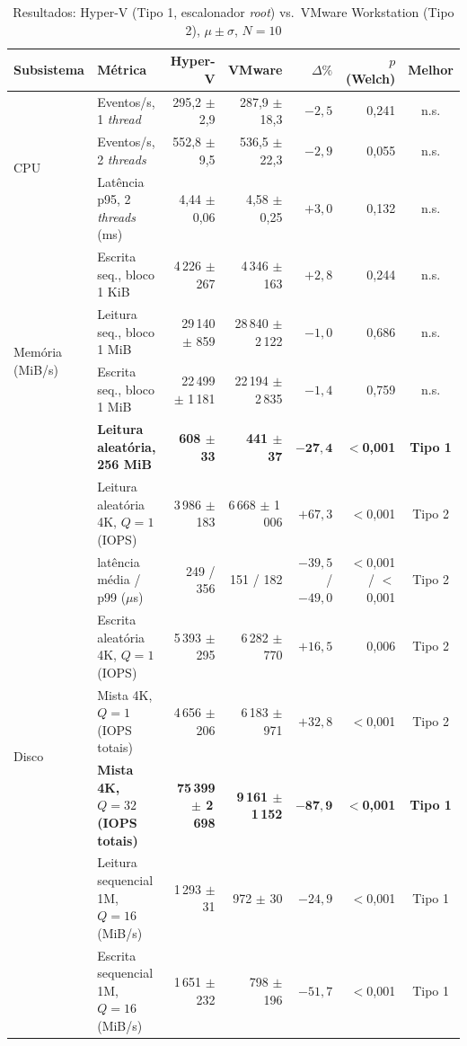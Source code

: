 \documentclass[conference]{IEEEtran}
\begin{document}
\begin{table}[t]
\caption{Resultados: Hyper-V (Tipo 1, escalonador \textit{root}) vs.\ VMware Workstation (Tipo 2), $\mu\pm\sigma$, $N=10$}
\label{tab_res}
\centering
\footnotesize
\begin{tabular}{@{}llrrrrc@{}}
\toprule
\textbf{Subsistema} & \textbf{Métrica} & \textbf{Hyper-V} & \textbf{VMware} & \textbf{$\Delta\%$} & \textbf{$p$ (Welch)} & \textbf{Melhor} \\
\midrule
\multirow{3}{*}{CPU}
 & Eventos/s, 1 \textit{thread} & 295,2 $\pm$ 2,9 & 287,9 $\pm$ 18,3 & $-2{,}5$ & 0,241 & n.s. \\
 & Eventos/s, 2 \textit{threads} & 552,8 $\pm$ 9,5 & 536,5 $\pm$ 22,3 & $-2{,}9$ & 0,055 & n.s. \\
 & Latência p95, 2 \textit{threads} (ms) & 4,44 $\pm$ 0,06 & 4,58 $\pm$ 0,25 & $+3{,}0$ & 0,132 & n.s. \\
\midrule
\multirow{4}{*}{Memória (MiB/s)}
 & Escrita seq., bloco 1 KiB & 4\,226 $\pm$ 267 & 4\,346 $\pm$ 163 & $+2{,}8$ & 0,244 & n.s. \\
 & Leitura seq., bloco 1 MiB & 29\,140 $\pm$ 859 & 28\,840 $\pm$ 2\,122 & $-1{,}0$ & 0,686 & n.s. \\
 & Escrita seq., bloco 1 MiB & 22\,499 $\pm$ 1\,181 & 22\,194 $\pm$ 2\,835 & $-1{,}4$ & 0,759 & n.s. \\
 & \textbf{Leitura aleatória, 256 MiB} & \textbf{608 $\pm$ 33} & \textbf{441 $\pm$ 37} & $\mathbf{-27{,}4}$ & $<$\textbf{0,001} & \textbf{Tipo 1} \\
\midrule
\multirow{7}{*}{Disco}
 & Leitura aleatória 4K, $Q=1$ (IOPS) & 3\,986 $\pm$ 183 & 6\,668 $\pm$ 1\,006 & $+67{,}3$ & $<$0,001 & Tipo 2 \\
 & \quad latência média / p99 ($\mu$s) & 249 / 356 & 151 / 182 & $-39{,}5$ / $-49{,}0$ & $<$0,001 / $<$0,001 & Tipo 2 \\
 & Escrita aleatória 4K, $Q=1$ (IOPS) & 5\,393 $\pm$ 295 & 6\,282 $\pm$ 770 & $+16{,}5$ & 0,006 & Tipo 2 \\
 & Mista 4K, $Q=1$ (IOPS totais) & 4\,656 $\pm$ 206 & 6\,183 $\pm$ 971 & $+32{,}8$ & $<$0,001 & Tipo 2 \\
 & \textbf{Mista 4K, $Q=32$ (IOPS totais)} & \textbf{75\,399 $\pm$ 2\,698} & \textbf{9\,161 $\pm$ 1\,152} & $\mathbf{-87{,}9}$ & $<$\textbf{0,001} & \textbf{Tipo 1} \\
 & Leitura sequencial 1M, $Q=16$ (MiB/s) & 1\,293 $\pm$ 31 & 972 $\pm$ 30 & $-24{,}9$ & $<$0,001 & Tipo 1 \\
 & Escrita sequencial 1M, $Q=16$ (MiB/s) & 1\,651 $\pm$ 232 & 798 $\pm$ 196 & $-51{,}7$ & $<$0,001 & Tipo 1 \\

\end{tabular}
\end{table}
\end{document}
